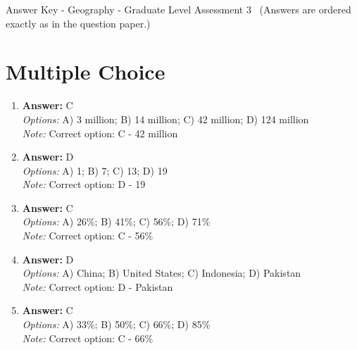 \documentclass[12pt]{article}
\begin{document}
\begin{center}
Answer Key - Geography - Graduate Level Assessment 3 \
\small (Answers are ordered exactly as in the question paper.)
\end{center}

\section*{Multiple Choice}
\begin{enumerate}[label=\arabic*.]
\item \textbf{Answer:} C
\\ \textit{Options:} A) 3 million; B) 14 million; C) 42 million; D) 124 million
\\ \textit{Note:} Correct option: C - 42 million
\item \textbf{Answer:} D
\\ \textit{Options:} A) 1; B) 7; C) 13; D) 19
\\ \textit{Note:} Correct option: D - 19
\item \textbf{Answer:} C
\\ \textit{Options:} A) 26\%; B) 41\%; C) 56\%; D) 71\%
\\ \textit{Note:} Correct option: C - 56\%
\item \textbf{Answer:} D
\\ \textit{Options:} A) China; B) United States; C) Indonesia; D) Pakistan
\\ \textit{Note:} Correct option: D - Pakistan
\item \textbf{Answer:} C
\\ \textit{Options:} A) 33\%; B) 50\%; C) 66\%; D) 85\%
\\ \textit{Note:} Correct option: C - 66\%
\end{enumerate}
\end{document}
